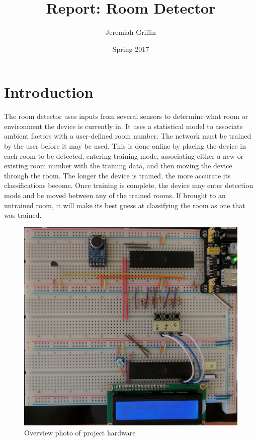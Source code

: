 \documentclass{article}
\title{Report: Room Detector}
\author{Jeremiah Griffin}
\date{Spring 2017}
\begin{document}
\maketitle
\newpage

\tableofcontents
\listoffigures
\listoftables
\newpage


\section{Introduction}

The room detector uses inputs from several sensors to determine what
room or environment the device is currently in.  It uses a statistical
model to associate ambient factors with a user-defined room number.  The
network must be trained by the user before it may be used.  This is done
online by placing the device in each room to be detected, entering
training mode, associating either a new or existing room number with the
training data, and then moving the device through the room.  The longer
the device is trained, the more accurate its classifications become.
Once training is complete, the device may enter detection mode and be
moved between any of the trained rooms.  If brought to an untrained
room, it will make its best guess at classifying the room as one that
was trained.

\begin{figure}[h]
  \centering
  \noindent\includegraphics[width = \textwidth]{overview}
  \caption{Overview photo of project hardware}
  \label{photo:1}
\end{figure}
\end{document}
